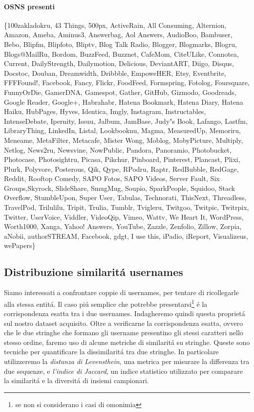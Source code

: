 \paragraph{OSNS presenti}
\{100zakladokru, 43 Things, 500px, ActiveRain, All Consuming, Alternion, Amazon, Ameba, Aminus3, Answerbag, Aol Answers, AudioBoo, Bambuser, Bebo, Blipfm, Blipfoto, Bliptv, Blog Talk Radio, Blogger, Blogmarks, Blogru, Blogs@MailRu, Bordom, BuzzFeed, Buzznet, CafeMom, CiteULike, Connotea, Current, DailyStrength, Dailymotion, Delicious, DeviantART, Diigo, Disqus, Docstoc, Douban, Dreamwidth, Dribbble, EmpoweHER, Etsy, Eventbrite, FFFFound!, Facebook, Fancy, Flickr, FoodFeed, Formspring, Fotolog, Foursquare, FunnyOrDie, GamerDNA, Gamespot, Gather, GitHub, Gizmodo, Goodreads, Google Reader, Google+, Habrahabr, Hatena Bookmark, Hatena Diary, Hatena Haiku, HubPages, Hyves, Identica, Imgly, Instagram, Instructables, IntenseDebate, Ipernity, Issuu, Jalbum, JamBase, Judy"s Book, Lafango, Lastfm, LibraryThing, LinkedIn, Listal, Lookbooknu, Magma, MeasuredUp, Memoriru, Meneame, MetaFilter, Metacafe, Mister Wong, Moblog, MobyPicture, Multiply, Netlog, News2ru, Newsvine, NowPublic, Pandora, Panoramio, Photobucket, Photocase, Photosightru, Picasa, Pikchur, Pinboard, Pinterest, Plancast, Plixi, Plurk, Polyvore, Posterous, Qik, Qype, RPodru, Raptr, RedBubble, RedGage, Reddit, Rooftop Comedy, SAPO Fotos, SAPO Videos, Server Fault, Six Groups,Skyrock, SlideShare, SmugMug, Soupio, SparkPeople, Squidoo, Stack Overflow, StumbleUpon, Super User, Tabulas, Technorati, ThisNext, Threadless, TravelPod, Trilulilu, Tripit, Trulia, Tumblr, Tvigleru, Twitgoo, Twitpic, Twitrpix, Twitter, UserVoice, Viddler, VideoQip, Vimeo, Wattv, We Heart It, WordPress, Worth1000, Xanga, Yahoo! Answers, YouTube, Zazzle, Zenfolio, Zillow, Zorpia, aNobii, authorSTREAM, Facebook, gdgt, I use this, iPadio, iReport, Visualizeus, wePapers\}

\subsection{Distribuzione similaritá usernames}
Siamo interessati a confrontare coppie di usernames, per tentare di ricollegarle alla stessa entitá. Il caso piú semplice che potrebbe presentarsi\footnote{se non si considerano i casi di omonimia} é la corrispondenza esatta tra i due usernames. Indagheremo quindi questa proprietá sul nostro dataset acquisito. Oltre a verificarne la corrispondenza esatta, ovvero che le due stringhe che formano gli username presentino gli stessi caratteri nello stesso ordine, faremo uso di alcune metriche di similaritá su stringhe. Queste sono tecniche per quantificare la dissimilaritá tra due stringhe. In particolare utilizzeremo la \textit{distanza di Levensthein}, una metrica per misurare la differenza tra due sequenze, e \textit{l'indice di Jaccard}, un indice statistico utilizzato per comparare la similaritá e la diversitá di insiemi campionari.


